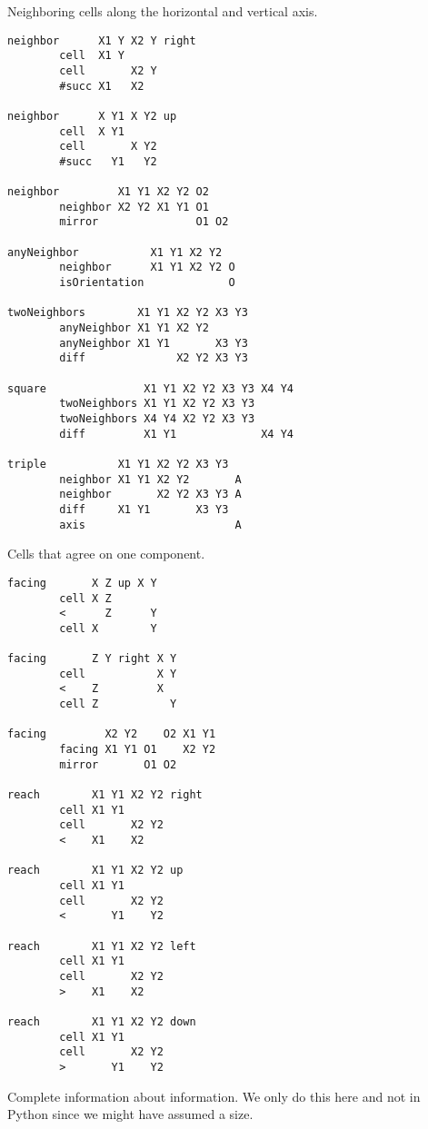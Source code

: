 Neighboring cells along the horizontal and vertical axis.

\begin{verbatim}
neighbor      X1 Y X2 Y right
        cell  X1 Y
        cell       X2 Y
        #succ X1   X2

neighbor      X Y1 X Y2 up
        cell  X Y1
        cell       X Y2
        #succ   Y1   Y2

neighbor         X1 Y1 X2 Y2 O2
        neighbor X2 Y2 X1 Y1 O1
        mirror               O1 O2

anyNeighbor           X1 Y1 X2 Y2
        neighbor      X1 Y1 X2 Y2 O
        isOrientation             O

twoNeighbors        X1 Y1 X2 Y2 X3 Y3
        anyNeighbor X1 Y1 X2 Y2
        anyNeighbor X1 Y1       X3 Y3
        diff              X2 Y2 X3 Y3

square               X1 Y1 X2 Y2 X3 Y3 X4 Y4
        twoNeighbors X1 Y1 X2 Y2 X3 Y3
        twoNeighbors X4 Y4 X2 Y2 X3 Y3
        diff         X1 Y1             X4 Y4

triple           X1 Y1 X2 Y2 X3 Y3
        neighbor X1 Y1 X2 Y2       A
        neighbor       X2 Y2 X3 Y3 A
        diff     X1 Y1       X3 Y3
        axis                       A
\end{verbatim}

Cells that agree on one component.

\begin{verbatim}
facing       X Z up X Y
        cell X Z
        <      Z      Y
        cell X        Y

facing       Z Y right X Y
        cell           X Y
        <    Z         X
        cell Z           Y

facing         X2 Y2    O2 X1 Y1
        facing X1 Y1 O1    X2 Y2
        mirror       O1 O2

reach        X1 Y1 X2 Y2 right
        cell X1 Y1
        cell       X2 Y2
        <    X1    X2

reach        X1 Y1 X2 Y2 up
        cell X1 Y1
        cell       X2 Y2
        <       Y1    Y2

reach        X1 Y1 X2 Y2 left
        cell X1 Y1
        cell       X2 Y2
        >    X1    X2

reach        X1 Y1 X2 Y2 down
        cell X1 Y1
        cell       X2 Y2
        >       Y1    Y2
\end{verbatim}

Complete information about information. We only do this here and not in
Python since we might have assumed a size.

